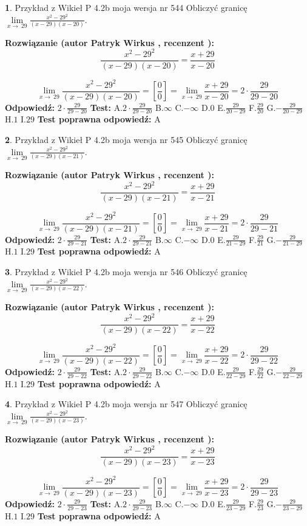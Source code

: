 \documentclass[12pt, a4paper]{article}
\theoremstyle{definition} %
\newtheorem{zad}{}
\newcommand{\zadStart}[1]{\begin{zad}#1\newline}
\newcommand{\zadStop}{\end{zad}}
\newcommand{\rozwStart}[2]{\noindent \textbf{Rozwiązanie (autor #1 , recenzent #2): }\newline}
\newcommand{\rozwStop}{\newline}
\newcommand{\odpStart}{\noindent \textbf{Odpowiedź:}\newline}
\newcommand{\odpStop}{\newline}
\newcommand{\testStart}{\noindent \textbf{Test:}\newline}
\newcommand{\testStop}{\newline}
\newcommand{\kluczStart}{\noindent \textbf{Test poprawna odpowiedź:}\newline}
\newcommand{\kluczStop}{\newline}
\begin{document}
\zadStart{Przykład z Wikieł P 4.2b moja wersja nr 544}
Obliczyć granicę $\lim\limits_{x\to\ 29}\frac{x^{2}-29^{2}}{(x-29)(x-20)}$.
\zadStop
\rozwStart{Patryk Wirkus}{}
$$\frac{x^{2}-29^{2}}{(x-29)(x-20)}=\frac{x+29}{x-20}$$

$$\lim\limits_{x\to\ 29}\frac{x^{2}-29^{2}}{(x-29)(x-20)}=[\frac{0}{0}]=\lim\limits_{x\to\ 29}\frac{x+29}{x-20}=2 \cdot \frac{29}{29-20}$$
\rozwStop
\odpStart
$2 \cdot \frac{29}{29-20}$
\odpStop
\testStart
A.$2 \cdot \frac{29}{29-20}$
B.$\infty$
C.$-\infty$
D.$0$
E.$\frac{29}{20-29}$
F.$\frac{29}{20}$
G.$-\frac{29}{20-29}$
H.$1$
I.$29$
\testStop
\kluczStart
A
\kluczStop



\zadStart{Przykład z Wikieł P 4.2b moja wersja nr 545}
Obliczyć granicę $\lim\limits_{x\to\ 29}\frac{x^{2}-29^{2}}{(x-29)(x-21)}$.
\zadStop
\rozwStart{Patryk Wirkus}{}
$$\frac{x^{2}-29^{2}}{(x-29)(x-21)}=\frac{x+29}{x-21}$$

$$\lim\limits_{x\to\ 29}\frac{x^{2}-29^{2}}{(x-29)(x-21)}=[\frac{0}{0}]=\lim\limits_{x\to\ 29}\frac{x+29}{x-21}=2 \cdot \frac{29}{29-21}$$
\rozwStop
\odpStart
$2 \cdot \frac{29}{29-21}$
\odpStop
\testStart
A.$2 \cdot \frac{29}{29-21}$
B.$\infty$
C.$-\infty$
D.$0$
E.$\frac{29}{21-29}$
F.$\frac{29}{21}$
G.$-\frac{29}{21-29}$
H.$1$
I.$29$
\testStop
\kluczStart
A
\kluczStop



\zadStart{Przykład z Wikieł P 4.2b moja wersja nr 546}
Obliczyć granicę $\lim\limits_{x\to\ 29}\frac{x^{2}-29^{2}}{(x-29)(x-22)}$.
\zadStop
\rozwStart{Patryk Wirkus}{}
$$\frac{x^{2}-29^{2}}{(x-29)(x-22)}=\frac{x+29}{x-22}$$

$$\lim\limits_{x\to\ 29}\frac{x^{2}-29^{2}}{(x-29)(x-22)}=[\frac{0}{0}]=\lim\limits_{x\to\ 29}\frac{x+29}{x-22}=2 \cdot \frac{29}{29-22}$$
\rozwStop
\odpStart
$2 \cdot \frac{29}{29-22}$
\odpStop
\testStart
A.$2 \cdot \frac{29}{29-22}$
B.$\infty$
C.$-\infty$
D.$0$
E.$\frac{29}{22-29}$
F.$\frac{29}{22}$
G.$-\frac{29}{22-29}$
H.$1$
I.$29$
\testStop
\kluczStart
A
\kluczStop



\zadStart{Przykład z Wikieł P 4.2b moja wersja nr 547}
Obliczyć granicę $\lim\limits_{x\to\ 29}\frac{x^{2}-29^{2}}{(x-29)(x-23)}$.
\zadStop
\rozwStart{Patryk Wirkus}{}
$$\frac{x^{2}-29^{2}}{(x-29)(x-23)}=\frac{x+29}{x-23}$$

$$\lim\limits_{x\to\ 29}\frac{x^{2}-29^{2}}{(x-29)(x-23)}=[\frac{0}{0}]=\lim\limits_{x\to\ 29}\frac{x+29}{x-23}=2 \cdot \frac{29}{29-23}$$
\rozwStop
\odpStart
$2 \cdot \frac{29}{29-23}$
\odpStop
\testStart
A.$2 \cdot \frac{29}{29-23}$
B.$\infty$
C.$-\infty$
D.$0$
E.$\frac{29}{23-29}$
F.$\frac{29}{23}$
G.$-\frac{29}{23-29}$
H.$1$
I.$29$
\testStop
\kluczStart
A
\kluczStop
\end{document}
